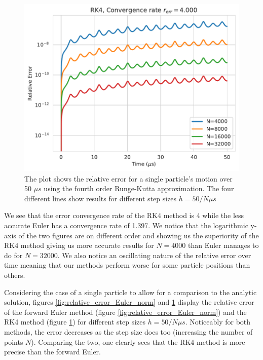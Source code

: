 \documentclass[english,notitlepage,reprint,nofootinbib]{revtex4-1}  %
\begin{document}
\begin{figure}[H]
    \centering
    \includegraphics[width=.5\textwidth]{../figures/relative_error_RK4_norm.pdf}
    \caption{The plot shows the relative error for a single particle's motion over 50 $\mu s$ using the fourth order Runge-Kutta approximation.
        The four different lines show results for different step sizes $h = 50/N \mu s$ }
    \label{fig:relative_error_RK4_norm}
\end{figure}
We see that the error convergence rate of the RK4 method is 4 while the less accurate Euler has a convergence rate of 1.397. We notice that the logarithmic y-axis of the two figures are on different order and showing us the superiority of the RK4 method giving us more accurate results for $N=4000$ than Euler manages to do for $N=32000$. We also notice an oscillating nature of the relative error over time meaning that our methods perform worse for some particle positions than others.

Considering the case of a single particle to allow for a comparison to the analytic solution, figures \ref{fig:relative_error_Euler_norm}
and \ref{fig:relative_error_RK4_norm} display the relative error of the forward Euler method (figure \ref{fig:relative_error_Euler_norm})
and the RK4 method (figure \ref{fig:relative_error_RK4_norm}) for different step sizes $h = 50/N \mu s$. Noticeably for both
methods, the error decreases as the step size does too (increasing the number of points $N$). Comparing the two, one clearly
sees that the RK4 method is more precise than the forward Euler.
\end{document}

